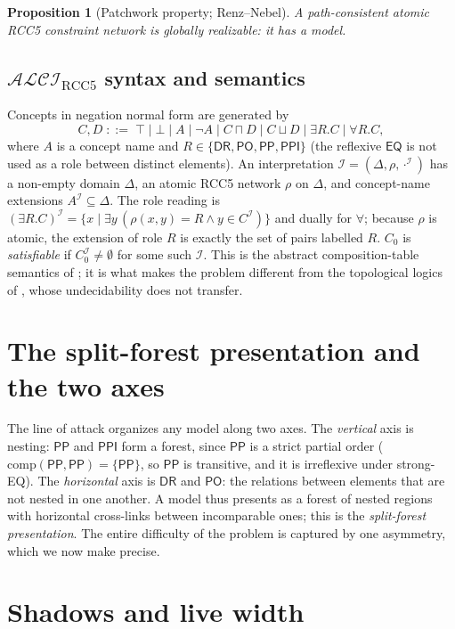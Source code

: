 \documentclass[11pt]{article}
\newcommand{\ALCIRCC}{\mathcal{ALCI}_{\mathrm{RCC5}}}
\newcommand{\Comp}{\mathrm{comp}}
\newcommand{\DR}{\mathsf{DR}}
\newcommand{\PO}{\mathsf{PO}}
\newcommand{\PP}{\mathsf{PP}}
\newcommand{\PPI}{\mathsf{PPI}}
\newcommand{\EQ}{\mathsf{EQ}}
\theoremstyle{plain}
\newtheorem{proposition}[theorem]{Proposition}
\theoremstyle{definition}
\begin{document}
\begin{proposition}[Patchwork property; Renz--Nebel]\label{prop:patchwork}
A path-consistent atomic RCC5 constraint network is globally
realizable: it has a model.
\end{proposition}

\subsection{$\ALCIRCC$ syntax and semantics}

Concepts in negation normal form are generated by
\[
C,D \;::=\; \top \mid \bot \mid A \mid \neg A \mid C\sqcap D \mid C\sqcup D
\mid \exists R.C \mid \forall R.C,
\]
where $A$ is a concept name and $R\in\{\DR,\PO,\PP,\PPI\}$ (the reflexive
$\EQ$ is not used as a role between distinct elements). An
interpretation $\mathcal I=(\Delta,\rho,\cdot^{\mathcal I})$ has a
non-empty domain $\Delta$, an atomic RCC5 network $\rho$ on $\Delta$,
and concept-name extensions $A^{\mathcal I}\subseteq\Delta$. The role
reading is
$(\exists R.C)^{\mathcal I}=\{x\mid \exists y\,(\rho(x,y)=R \wedge y\in
C^{\mathcal I})\}$ and dually for $\forall$; because $\rho$ is atomic,
the extension of role $R$ is exactly the set of pairs labelled $R$.
$C_0$ is \emph{satisfiable} if $C_0^{\mathcal I}\neq\emptyset$ for some
such $\mathcal I$. This is the abstract composition-table semantics of
\cite{wessel2003}; it is what makes the problem different from the
topological logics of \cite{lutzwolter2006}, whose undecidability does
not transfer.

\section{The split-forest presentation and the two axes}\label{sec:axes}

The line of attack organizes any model along two axes. The
\emph{vertical} axis is nesting: $\PP$ and $\PPI$ form a forest, since
$\PP$ is a strict partial order ($\Comp(\PP,\PP)=\{\PP\}$, so $\PP$ is
transitive, and it is irreflexive under strong-EQ). The
\emph{horizontal} axis is $\DR$ and $\PO$: the relations between
elements that are not nested in one another. A model thus presents as a
forest of nested regions with horizontal cross-links between
incomparable ones; this is the \emph{split-forest presentation}. The
entire difficulty of the problem is captured by one asymmetry, which we
now make precise.

\section{Shadows and live width}\label{sec:width}
\end{document}
